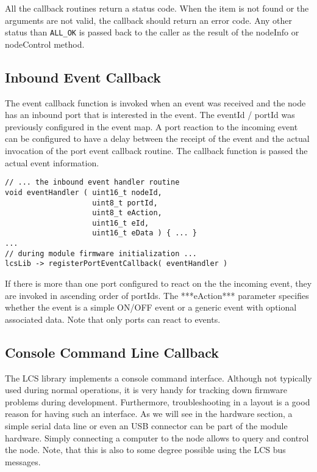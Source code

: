 All the callback routines return a status code. When the item is not found or the arguments are not valid, the callback should return an error code. Any other status than \texttt{ALL\_OK} is passed back to the caller as the result of the nodeInfo or nodeControl method.

\subsection{Inbound Event Callback}

The event callback function is invoked when an event was received and the node has an inbound port that is interested in the event. The eventId / portId was previously configured in the event map. A port reaction to the incoming event can be configured to have a delay between the receipt of the event and the actual invocation of the port event callback routine. The callback function is passed the actual event information.

\lstset{style=codesnippetstyle}
\begin{lstlisting}
// ... the inbound event handler routine
void eventHandler ( uint16_t nodeId, 
                    uint8_t portId, 
                    uint8_t eAction,
                    uint16_t eId, 
                    uint16_t eData ) { ... }
...
// during module firmware initialization ...
lcsLib -> registerPortEventCallback( eventHandler )
\end{lstlisting}

If there is more than one port configured to react on the the incoming event, they are invoked in ascending order of portIds. The ***eAction*** parameter specifies whether the event is a simple ON/OFF event or a generic event with optional associated data. Note that only ports can react to events.

\subsection{Console Command Line Callback}

The LCS library implements a console command interface. Although not typically used during normal operations, it is very handy for tracking down firmware problems during development. Furthermore, troubleshooting in a layout is a good reason for having such an interface. As we will see in the hardware section, a simple serial data line or even an USB connector can be part of the module hardware. Simply connecting a computer to the node allows to query and control the node. Note, that this is also to some degree possible using the LCS bus messages.

